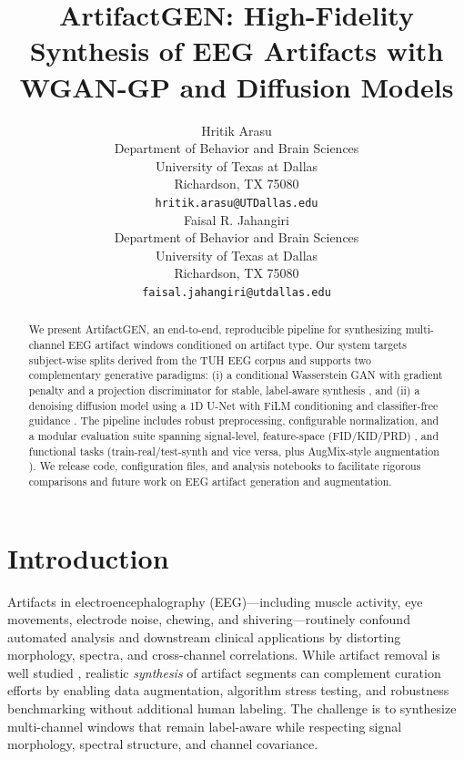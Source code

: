 \documentclass{article}
\title{ArtifactGEN: High-Fidelity Synthesis of EEG Artifacts with WGAN-GP and Diffusion Models}
\author{
  Hritik Arasu \\
  Department of Behavior and Brain Sciences\\
  University of Texas at Dallas\\
  Richardson, TX 75080 \\
  \texttt{hritik.arasu@UTDallas.edu} \\
  \And
  Faisal R. Jahangiri \\
  Department of Behavior and Brain Sciences\\
  University of Texas at Dallas\\
  Richardson, TX 75080 \\
  \texttt{faisal.jahangiri@utdallas.edu} \\
}
\begin{document}
\maketitle

\begin{abstract}
We present ArtifactGEN, an end-to-end, reproducible pipeline for synthesizing multi-channel EEG artifact windows conditioned on artifact type. Our system targets subject-wise splits derived from the TUH EEG corpus and supports two complementary generative paradigms: (i) a conditional Wasserstein GAN with gradient penalty and a projection discriminator for stable, label-aware synthesis \citep{gulrajani2017improved,miyato2018cgans}, and (ii) a denoising diffusion model using a 1D U-Net with FiLM conditioning and classifier-free guidance \citep{ho2020denoising,ho2022classifierfree}. The pipeline includes robust preprocessing, configurable normalization, and a modular evaluation suite spanning signal-level, feature-space (FID/KID/PRD) \citep{heusel2017gans,binkowski2018demystifying,sajjadi2018assessing}, and functional tasks (train-real/test-synth and vice versa, plus AugMix-style augmentation \citep{hendrycks2020augmix}). We release code, configuration files, and analysis notebooks to facilitate rigorous comparisons and future work on EEG artifact generation and augmentation.
\end{abstract}



\section{Introduction}
Artifacts in electroencephalography (EEG)—including muscle activity, eye movements, electrode noise, chewing, and shivering—routinely confound automated analysis and downstream clinical applications by distorting morphology, spectra, and cross-channel correlations. While artifact removal is well studied \citep{uriguen2015artifactremoval,jiang2019artifactremoval}, realistic \emph{synthesis} of artifact segments can complement curation efforts by enabling data augmentation, algorithm stress testing, and robustness benchmarking without additional human labeling. The challenge is to synthesize multi-channel windows that remain label-aware while respecting signal morphology, spectral structure, and channel covariance.
\end{document}
